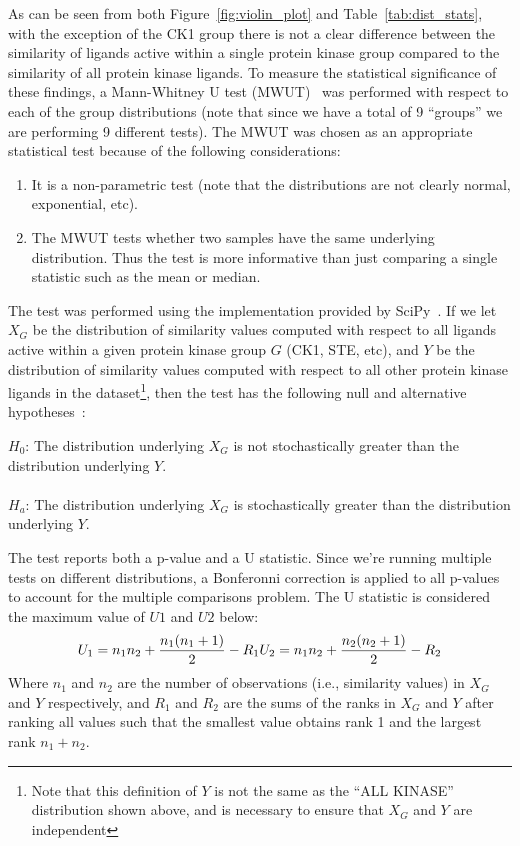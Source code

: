 \documentclass[11pt]{article}
\begin{document}
As can be seen from both Figure~\ref{fig:violin_plot} and Table~\ref{tab:dist_stats}, with the exception of the CK1 group there is not a clear difference between the similarity of ligands active within a single protein kinase group compared to the similarity of all protein kinase ligands. 
To measure the statistical significance of these findings, a Mann-Whitney U test (MWUT)~\cite{mann_whitney_1947} was performed with respect to each of the group distributions (note that since we have a total of 9 ``groups'' we are performing 9 different tests). 
The MWUT was chosen as an appropriate statistical test because of the following considerations:
\begin{enumerate}
    \item It is a non-parametric test (note that the distributions are not clearly normal, exponential, etc).
    \item The MWUT tests whether two samples have the same underlying distribution. Thus the test is more informative than just comparing a single statistic such as the mean or median. 
\end{enumerate}
The test was performed using the implementation provided by SciPy~\cite{scipy_2020,scipy_manual_2025}. 
If we let $X_G$ be the distribution of similarity values computed with respect to all ligands active within a given protein kinase group $G$ (CK1, STE, etc), and $Y$ be the distribution of similarity values computed with respect to all other protein kinase ligands in the dataset\footnote{Note that this definition of $Y$ is not the same as the ``ALL KINASE'' distribution shown above, and is necessary to ensure that $X_G$ and $Y$ are independent}, then the test has the following null and alternative hypotheses~\cite{scipy_manual_2025}:\\
\begin{adjustwidth}{2.5em}{0pt}
$H_0$: The distribution underlying $X_G$ is not stochastically greater than the distribution underlying $Y$.\\\\
$H_a$: The distribution underlying $X_G$ is stochastically greater than the distribution underlying $Y$.\\
\end{adjustwidth}
\noindent
The test reports both a p-value and a U statistic. Since we're running multiple tests on different distributions, a Bonferonni correction is applied to all p-values to account for the multiple comparisons problem. 
The U statistic is considered the maximum value of $U1$ and $U2$ below:
\begin{equation}
U_1 = n_1n_2 + \frac{n_1(n_1+1)}{2}- R_1 \\
U_2 = n_1n_2 + \frac{n_2(n_2+1)}{2}- R_2 \\
\end{equation}
Where $n_1$ and $n_2$ are the number of observations (i.e., similarity values) in $X_G$ and $Y$ respectively, and $R_1$ and $R_2$ are the sums of the ranks in $X_G$ and $Y$ after ranking all values such that the smallest value obtains rank 1 and the largest rank $n_1 + n_2$. 
\end{document}
